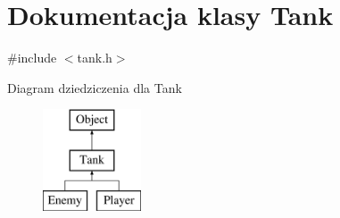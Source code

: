 \hypertarget{class_tank}{}\section{Dokumentacja klasy Tank}
\label{class_tank}


{\ttfamily \#include $<$tank.\+h$>$}

Diagram dziedziczenia dla Tank\begin{figure}[H]
\begin{center}
\leavevmode
\includegraphics[height=3.000000cm]{class_tank}
\end{center}
\end{figure}

